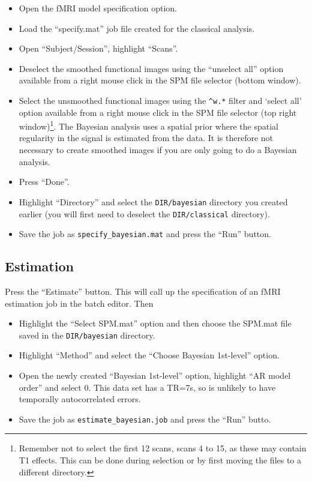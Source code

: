 \begin{itemize}
\item Open the fMRI model specification option.
\item Load the ``specify.mat'' job file created for the classical analysis.
\item Open ``Subject/Session'', highlight ``Scans''.
\item Deselect the smoothed functional images using the ``unselect all'' option available from a right mouse click in the SPM file selector (bottom window).
\item Select the unsmoothed functional images using the \texttt{\textasciicircum w.*} filter and `select all' option available from a right mouse click in the SPM file selector (top right window)\footnote{Remember not to select the first 12 scans, scans 4 to 15, as these may contain T1 effects. This can be done during selection or by first moving the files to a different directory.}. The Bayesian analysis uses a spatial prior where the spatial regularity in the signal is estimated from the data. It is therefore not necessary to create smoothed images if you are only going to do a Bayesian analysis.
\item Press ``Done''.
\item Highlight ``Directory'' and select the \texttt{DIR/bayesian} directory you created earlier (you will first need to deselect the \texttt{DIR/classical} directory).
\item Save the job as \texttt{specify\_bayesian.mat} and press the ``Run'' button.
\end{itemize}

\subsection{Estimation}

Press the ``Estimate'' button. This will call up the specification of an fMRI estimation job in the batch editor. Then

\begin{itemize}
\item Highlight the ``Select SPM.mat'' option and then choose the SPM.mat file saved in the \texttt{DIR/bayesian} directory.
\item Highlight ``Method'' and select the ``Choose Bayesian 1st-level'' option.
\item Open the newly created ``Bayesian 1st-level'' option, highlight ``AR model order'' and select 0. This data set has a TR=7s, so is unlikely to have temporally autocorrelated errors.
\item Save the job as \texttt{estimate\_bayesian.job} and press the ``Run'' butto.
\end{itemize}

